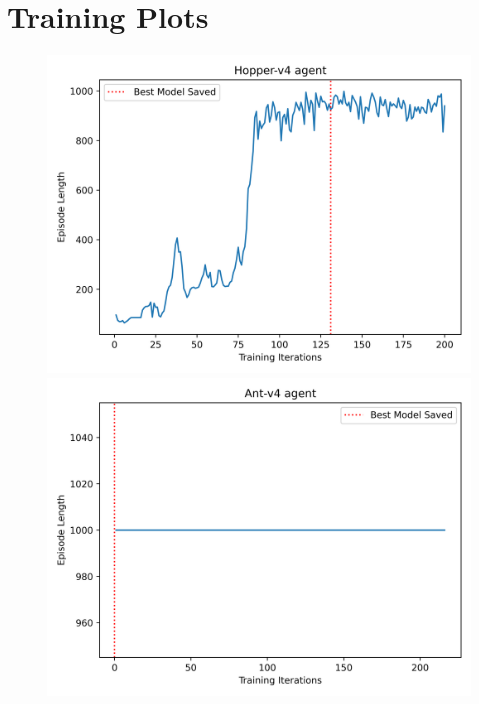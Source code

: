 \section{Training Plots}

\begin{figure}[H]
\centering
\captionsetup{font=small}
\setlength{\belowcaptionskip}{-8pt}

\begin{minipage}{0.42\textwidth}
    \centering
    \includegraphics[width=\linewidth]{plots/Hopper-v4_episode_length.png}
\end{minipage}%
\hfill
\begin{minipage}{0.42\textwidth}
    \centering
    \includegraphics[width=\linewidth]{plots/Ant-v4_episode_length.png}
\end{minipage}


\end{figure}
